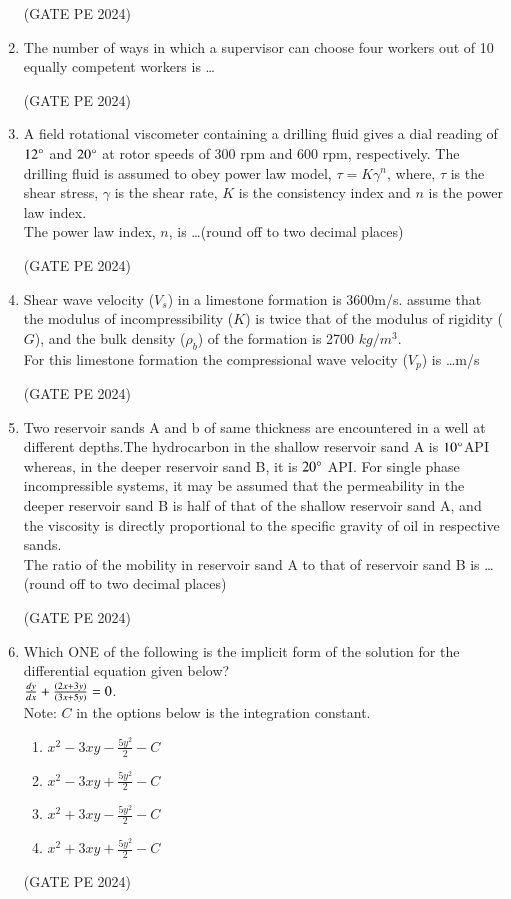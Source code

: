 \documentclass[journal,12pt,onecolumn]{IEEEtran}
\theoremstyle{remark}
\begin{document}
\begin{enumerate}
\hfill{(GATE PE 2024)}

\item The number of ways in which a supervisor can choose four workers out of 10 equally competent workers is \dots


\hfill{(GATE PE 2024)}

\item A field rotational viscometer containing a drilling fluid gives a dial reading of $12\degree$ and $20\degree$ at rotor speeds of 300 rpm and 600 rpm, respectively. The drilling fluid is assumed to obey power law model, $\tau=K\gamma^n$, where, $\tau$ is the shear stress, $\gamma$ is the shear rate, $K$ is the consistency index and $n$ is the power law index.\\
The power law index, $n$, is \dots (round off to two decimal places)

\hfill{(GATE PE 2024)}

\item Shear wave velocity ($V_s$) in a limestone formation is 3600m/s. assume that the modulus of incompressibility ($K$) is twice that of the modulus of rigidity ($G$), and the bulk density ($\rho_b$) of the formation is 2700 $kg/m^3$.\\
For this limestone formation the compressional wave velocity ($V_p$) is \dots m/s

\hfill{(GATE PE 2024)}

\item Two reservoir sands A and b of same thickness are encountered in a well at different depths.The hydrocarbon in the shallow reservoir sand A is $10\degree$API whereas, in the deeper reservoir 
sand B, it is $20\degree$ API. For single phase incompressible systems, it may be assumed that the permeability in the deeper reservoir sand B is half of that of the shallow reservoir sand A, and the viscosity is directly proportional to the specific gravity of oil in respective sands.\\
The ratio of the mobility in reservoir sand A to that of reservoir sand B is \dots (round off to two decimal places)

\hfill{(GATE PE 2024)}

\item Which ONE of the following is the implicit form of the solution for the differential equation given below?\\
$\frac{dy}{dx}+\frac{\left(2x+3y\right)}{\left(3x+5y\right)}=0$.\\
Note: $C$ in the options below is the integration constant.
\begin{enumerate}
    \item $x^2-3xy-\frac{5y^2}{2}-C$
    \item $x^2-3xy+\frac{5y^2}{2}-C$
    \item $x^2+3xy-\frac{5y^2}{2}-C$
    \item $x^2+3xy+\frac{5y^2}{2}-C$
\end{enumerate}
\hfill{(GATE PE 2024)}


\end{enumerate}
\end{document}
